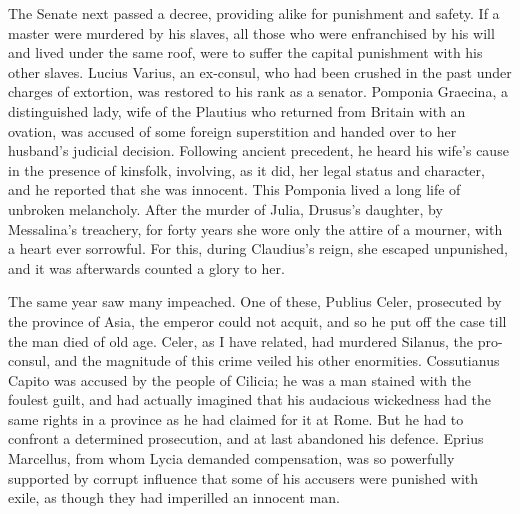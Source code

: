 
The Senate next passed a decree, providing alike for punishment and safety. If a master were murdered by his slaves, all those who were enfranchised by his will and lived under the same roof, were to suffer the capital punishment with his other slaves. Lucius Varius, an ex-consul, who had been crushed in the past under charges of extortion, was restored to his rank as a senator. Pomponia Graecina, a distinguished lady, wife of the Plautius who returned from Britain with an ovation, was accused of some foreign superstition and handed over to her husband's judicial decision. Following ancient precedent, he heard his wife's cause in the presence of kinsfolk, involving, as it did, her legal status and character, and he reported that she was innocent. This Pomponia lived a long life of unbroken melancholy. After the murder of Julia, Drusus's daughter, by Messalina's treachery, for forty years she wore only the attire of a mourner, with a heart ever sorrowful. For this, during Claudius's reign, she escaped unpunished, and it was afterwards counted a glory to her.


The same year saw many impeached. One of these, Publius Celer, prosecuted by the province of Asia, the emperor could not acquit, and so he put off the case till the man died of old age. Celer, as I have related, had murdered Silanus, the pro-consul, and the magnitude of this crime veiled his other enormities. Cossutianus Capito was accused by the people of Cilicia; he was a man stained with the foulest guilt, and had actually imagined that his audacious wickedness had the same rights in a province as he had claimed for it at Rome. But he had to confront a determined prosecution, and at last abandoned his defence. Eprius Marcellus, from whom Lycia demanded compensation, was so powerfully supported by corrupt influence that some of his accusers were punished with exile, as though they had imperilled an innocent man.


